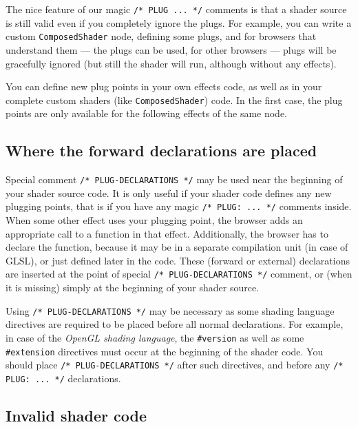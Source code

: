 \documentclass{egpubl}
\begin{document}
The nice feature of our magic \texttt{/* PLUG ... */} comments is that a shader source
is still valid even if you completely ignore the plugs. For example,
you can write a custom \texttt{ComposedShader} node, defining some plugs,
and for browsers that understand them --- the plugs can be used,
for other browsers --- plugs will be gracefully ignored (but still
the shader will run, although without any effects).

You can define new plug points in your own effects code, as well as in your
complete custom shaders (like \texttt{ComposedShader}) code.
In the first case, the plug points
are only available for the following effects of the same node.

\subsection{Where the forward declarations are placed}

Special comment \texttt{/* PLUG-DECLARATIONS */} may be used
near the beginning of your shader source code. It is only useful
if your shader code defines any new plugging points, that is if you
have any magic \texttt{/* PLUG: ... */} comments inside.
When some other effect uses your plugging point, the browser adds
an appropriate call to a function in that effect.
Additionally, the browser has to declare the function,
because it may be in a separate compilation unit (in case of GLSL),
or just defined later in the code.
These (forward or external) declarations are inserted at
the point of special \texttt{/* PLUG-DECLARATIONS */}
comment, or (when it is missing) simply at the beginning of your shader source.

Using \texttt{/* PLUG-DECLARATIONS */} may be necessary
as some shading language directives are required to be placed before
all normal declarations. For example, in case of the \emph{OpenGL shading language},
the \texttt{\#version} as well as some \texttt{\#extension} directives
must occur at the beginning of the shader code. You should place
\texttt{/* PLUG-DECLARATIONS */} after such directives,
and before any \texttt{/* PLUG: ... */} declarations.

\subsection{Invalid shader code}
\end{document}
